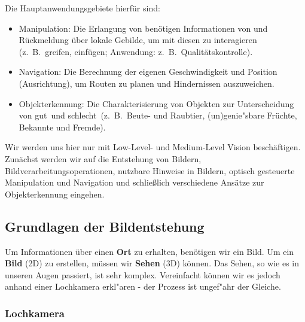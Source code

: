 Die Hauptanwendungsgebiete hierfür sind:
\begin{itemize}
\item Manipulation: Die Erlangung von benötigen Informationen von und Rückmeldung über lokale Gebilde, um mit diesen zu interagieren (z.~B.\ greifen, einfügen; Anwendung: z.~B.\ Qualitätskontrolle).
\item Navigation: Die Berechnung der eigenen Geschwindigkeit und Position (Ausrichtung), um Routen zu planen und Hindernissen auszuweichen.
\item Objekterkennung: Die Charakterisierung von Objekten zur Unterscheidung von \glqq gut\grqq\ und \glqq schlecht\grqq\ (z.~B.\ Beute- und Raubtier, (un)genie"sbare Früchte, Bekannte und Fremde).
\end{itemize}

Wir werden uns hier nur mit Low-Level- und Medium-Level Vision beschäftigen.
Zunächst werden wir auf die Entstehung von Bildern, Bildverarbeitungsoperationen, nutzbare Hinweise in Bildern, optisch gesteuerte Manipulation und Navigation und schließlich verschiedene Ansätze zur Objekterkennung eingehen.

\subsection{Grundlagen der Bildentstehung}

Um Informationen über einen \textbf{Ort} zu erhalten, benötigen wir ein Bild. Um ein \textbf{Bild} (2D) zu erstellen, müssen wir \textbf{Sehen} (3D) können. Das Sehen, so wie es in unseren Augen passiert, ist sehr komplex. Vereinfacht können wir es jedoch  anhand einer Lochkamera erkl"aren - der Prozess ist ungef"ahr der Gleiche.

\subsubsection{Lochkamera}


